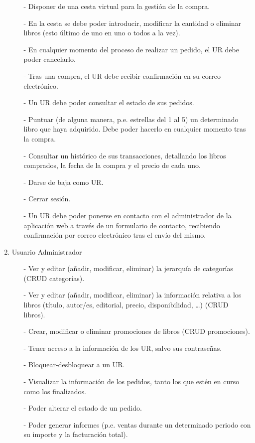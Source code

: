 \documentclass[a4paper,12pt,twoside,openright]{report}
\begin{document}
\begin{enumerate}
\begin{itemize}
                    \item[-] Disponer de una cesta virtual para la gestión de la compra.
                    \item[-] En la cesta se debe poder introducir, modificar la cantidad o eliminar libros (esto último de uno en uno o todos a la vez).
                    \item[-] En cualquier momento del proceso de realizar un pedido, el UR debe poder cancelarlo.
                    \item[-] Tras una compra, el UR debe recibir confirmación en su correo electrónico.
                    \item[-] Un UR debe poder consultar el estado de sus pedidos.
                    \item[-] Puntuar (de alguna manera, p.e. estrellas del 1 al 5) un determinado libro que haya adquirido. Debe poder hacerlo en cualquier momento tras la compra.
                    \item[-] Consultar un histórico de sus transacciones, detallando los libros comprados, la fecha de la compra y el precio de cada uno.
                    \item[-] Darse de baja como UR.
                    \item[-] Cerrar sesión.
                    \item[-] Un UR debe poder ponerse en contacto con el administrador de la aplicación web a través de un formulario de contacto, recibiendo confirmación por correo electrónico tras el envío del mismo.
                \end{itemize}
                \item Usuario Administrador
                \begin{itemize}
                    \item[-] Ver y editar (añadir, modificar, eliminar) la jerarquía de categorías (CRUD categorías).
                    \item[-] Ver y editar (añadir, modificar, eliminar) la información relativa a los libros (título, autor/es, editorial, precio, disponibilidad, \ldots) (CRUD libros).
                    \item[-] Crear, modificar o eliminar promociones de libros (CRUD promociones).
                    \item[-] Tener acceso a la información de los UR, salvo sus contraseñas.
                    \item[-] Bloquear-desbloquear a un UR.
                    \item[-] Visualizar la información de los pedidos, tanto los que estén en curso como los finalizados.
                    \item[-] Poder alterar el estado de un pedido.
                    \item[-] Poder generar informes (p.e. ventas durante un determinado periodo con su importe y la facturación total).
                \end{itemize}
            \end{enumerate}
\end{document}
